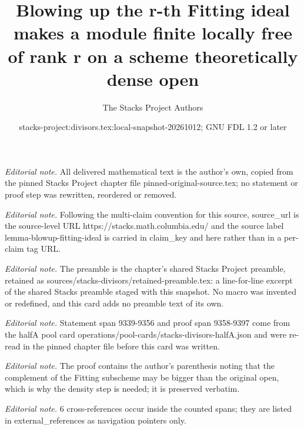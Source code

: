 \documentclass[10pt,a4paper]{amsart}
\title{Blowing up the r-th Fitting ideal makes a module finite locally free of rank r on a scheme theoretically dense open}
\author{The Stacks Project Authors}
\date{stacks-project:divisors.tex:local-snapshot-20261012; GNU FDL 1.2 or later}
\theoremstyle{plain}
\theoremstyle{definition}
\theoremstyle{remark}
\numberwithin{equation}{subsection}
\begin{document}
\maketitle
\noindent\textit{Editorial note.} All delivered mathematical text is the author's own, copied from the pinned Stacks Project chapter file pinned-original-source.tex; no statement or proof step was rewritten, reordered or removed.\par\medskip
\noindent\textit{Editorial note.} Following the multi-claim convention for this source, source\_url is the source-level URL https://stacks.math.columbia.edu/ and the source label lemma-blowup-fitting-ideal is carried in claim\_key and here rather than in a per-claim tag URL.\par\medskip
\noindent\textit{Editorial note.} The preamble is the chapter's shared Stacks Project preamble, retained as sources/stacks-divisors/retained-preamble.tex: a line-for-line excerpt of the shared Stacks preamble staged with this snapshot. No macro was invented or redefined, and this card adds no preamble text of its own.\par\medskip
\noindent\textit{Editorial note.} Statement span 9339-9356 and proof span 9358-9397 come from the halfA pool card operations/pool-cards/stacks-divisors-halfA.json and were re-read in the pinned chapter file before this card was written.\par\medskip
\noindent\textit{Editorial note.} The proof contains the author's parenthesis noting that the complement of the Fitting subscheme may be bigger than the original open, which is why the density step is needed; it is preserved verbatim.\par\medskip
\noindent\textit{Editorial note.} 6 cross-references occur inside the counted spans; they are listed in external\_references as navigation pointers only.\par\medskip
\end{document}
